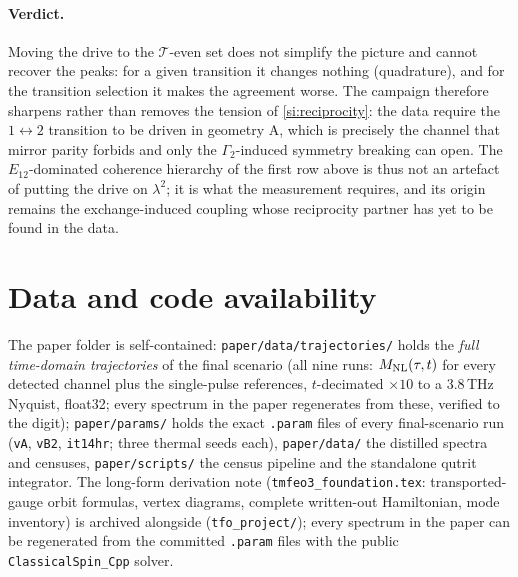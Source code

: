 \documentclass[11pt]{article}
\begin{document}
\paragraph{Verdict.}
Moving the drive to the $\mathcal T$-even set does not simplify the picture and
cannot recover the peaks: for a given transition it changes nothing (quadrature),
and for the transition selection it makes the agreement worse.  The campaign
therefore sharpens rather than removes the tension of
\cref{si:reciprocity}: the data require the $1\!\leftrightarrow\!2$ transition
to be driven in geometry A, which is precisely the channel that mirror parity
forbids and only the $\Gamma_2$-induced symmetry breaking can open.  The
$E_{12}$-dominated coherence hierarchy of the first row above is thus not an
artefact of putting the drive on $\lambda^2$; it is what the measurement
requires, and its origin remains the exchange-induced coupling whose
reciprocity partner has yet to be found in the data.

\section{Data and code availability}
The paper folder is self-contained: \texttt{paper/data/trajectories/}
holds the \emph{full time-domain trajectories} of the final scenario
(all nine runs: $M_{\rm NL}(\tau,t)$ for every detected channel plus
the single-pulse references, $t$-decimated $\times10$ to a
$3.8$\,THz Nyquist, float32; every spectrum in the paper regenerates
from these, verified to the digit); \texttt{paper/params/} holds the
exact \texttt{.param} files of every final-scenario run
(\texttt{vA}, \texttt{vB2}, \texttt{it14hr}; three thermal seeds each),
\texttt{paper/data/} the distilled spectra and censuses,
\texttt{paper/scripts/} the census pipeline and the standalone qutrit
integrator.  The long-form derivation note
(\texttt{tmfeo3\_foundation.tex}: transported-gauge orbit formulas,
vertex diagrams, complete written-out Hamiltonian, mode inventory) is
archived alongside (\texttt{tfo\_project/}); every spectrum in the
paper can be regenerated from the committed \texttt{.param} files with
the public \texttt{ClassicalSpin\_Cpp} solver.
\end{document}

